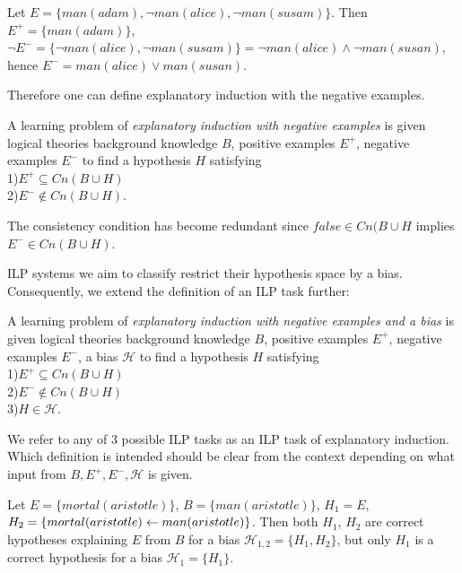 \begin{exmp}\cite{explanatory_induction_example}
Let $E=\{man(adam), \neg man(alice), \neg man(susam)\}$. Then $E^{+}=\{man(adam)\}$,
$\neg E^{-} = \{\neg man(alice), \neg man(susam)\}=\neg man(alice) \land \neg man(susan)$, hence
$E^{-} = man(alice) \lor man(susan)$.
\end{exmp}

Therefore one can define explanatory induction with the negative examples.
\begin{defn}\label{explanatory_induction_with_negative_examples_definition}
A learning problem of \emph{explanatory induction with negative examples} is given logical theories background knowledge $B$, positive examples $E^{+}$, negative examples $E^{-}$ to find a hypothesis $H$ satisfying\\
1)$E^{+} \subseteq Cn(B \cup H)$\\
2)$E^{-} \not\in Cn(B \cup H)$.
\end{defn}
The consistency condition has become redundant since $false \in Cn(B \cup H$ implies $E^{-} \in Cn(B \cup H)$.

ILP systems we aim to classify restrict their hypothesis space by a bias. Consequently, we extend the definition of an ILP task further:
\begin{defn}\label{definition_explanatory_induction_with_bias}
A learning problem of \emph{explanatory induction with negative examples and a bias} is given logical theories background knowledge $B$, positive examples $E^{+}$, negative examples $E^{-}$, a bias $\mathcal{H}$ to find a hypothesis $H$ satisfying\\
1)$E^{+} \subseteq Cn(B \cup H)$\\
2)$E^{-} \not\in Cn(B \cup H)$\\
3)$H \in \mathcal{H}$.
\end{defn}

We refer to any of 3 possible ILP tasks as an ILP task of explanatory induction. Which definition is intended should be clear from the context depending on what input from $B, E^+, E^-, \mathcal{H}$ is given.

\begin{exmp}\label{explanatory_induction_example}
Let $E=\{mortal(aristotle)\}$, $B=\{man(aristotle)\}$,
$H_1=E$, $H_2=\{mortal(aristotle) \leftarrow man(aristotle)\}$.
Then both $H_1$, $H_2$ are correct hypotheses explaining $E$ from $B$ for a bias $\mathcal{H}_{1,2}=\{H_1, H_2\}$, but only $H_1$ is a correct hypothesis for a bias $\mathcal{H}_1=\{H_1\}$.
\end{exmp}

